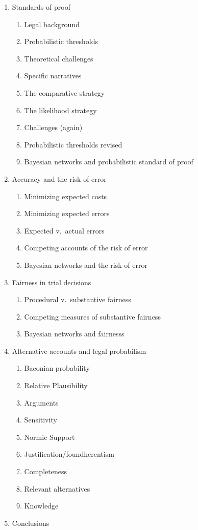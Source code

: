 \documentclass[10pt,dvipsnames,enabledeprecatedfontcommands]{scrartcl}
\begin{document}
\begin{enumerate}
\begin{enumerate}
  \item  Standards of proof
  \begin{enumerate}
  \item  Legal background
  \item  Probabilistic thresholds
  \item  Theoretical challenges
  \item  Specific narratives
  \item The comparative strategy
  \item  The likelihood strategy
  \item Challenges (again)
  \item Probabilistic thresholds revised
  \item  Bayesian networks and probabilistic standard of proof
  \end{enumerate}

  \item  Accuracy and the risk of error
  \begin{enumerate}
  \item  Minimizing expected costs
  \item  Minimizing expected errors
  \item  Expected v.\ actual errors
  \item  Competing accounts of the risk of error
  \item  Bayesian networks and the risk of error
  \end{enumerate}



  \item  Fairness in trial decisions
  \begin{enumerate}
  \item  Procedural v.\ substantive fairness
  \item  Competing measures of substantive fairness
  \item  Bayesian networks and fairnesss
  \end{enumerate}


  \item  Alternative accounts and legal probabilism
  \begin{enumerate}
  \item  Baconian probability
  \item  Relative Plausibility
  \item  Arguments
  \item  Sensitivity
  \item  Normic Support
  \item  Justification/foundherentism
  \item  Completeness
  \item  Relevant alternatives
  \item  Knowledge
  \end{enumerate}

\item Conclusions
\end{enumerate}
\end{enumerate}
\end{document}
